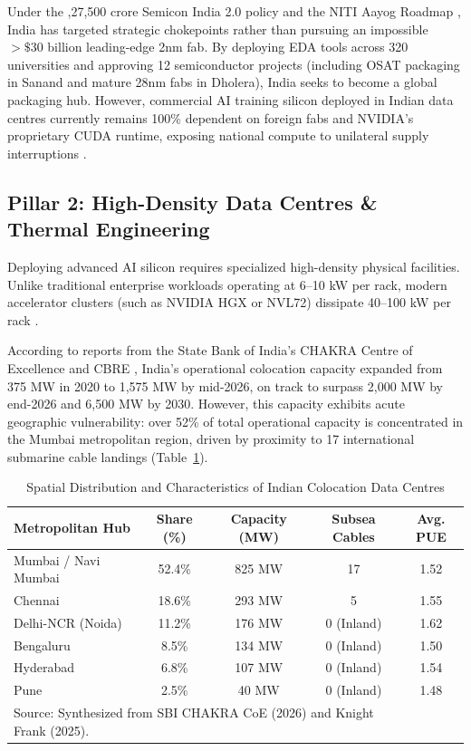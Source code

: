 \documentclass[conference,a4paper]{IEEEtran}
\begin{document}
Under the ,27,500 crore Semicon India 2.0 policy and the NITI Aayog Roadmap \cite{niti2026semicon}, India has targeted strategic chokepoints rather than pursuing an impossible $>\$30$ billion leading-edge 2nm fab. By deploying EDA tools across 320 universities and approving 12 semiconductor projects (including OSAT packaging in Sanand and mature 28nm fabs in Dholera), India seeks to become a global packaging hub. However, commercial AI training silicon deployed in Indian data centres currently remains 100\% dependent on foreign fabs and NVIDIA's proprietary CUDA runtime, exposing national compute to unilateral supply interruptions \cite{thakker2026sovereign}.

\subsection{Pillar 2: High-Density Data Centres \& Thermal Engineering}
Deploying advanced AI silicon requires specialized high-density physical facilities. Unlike traditional enterprise workloads operating at 6–10 kW per rack, modern accelerator clusters (such as NVIDIA HGX or NVL72) dissipate 40–100 kW per rack \cite{ieee_tcpmt2026cooling}. 

According to reports from the State Bank of India's CHAKRA Centre of Excellence \cite{sbichakra2026} and CBRE \cite{cbre2026dc}, India's operational colocation capacity expanded from 375 MW in 2020 to 1,575 MW by mid-2026, on track to surpass 2,000 MW by end-2026 and 6,500 MW by 2030. However, this capacity exhibits acute geographic vulnerability: over 52\% of total operational capacity is concentrated in the Mumbai metropolitan region, driven by proximity to 17 international submarine cable landings (Table~\ref{tab:dc_metros}).

\begin{table}[htbp]
\caption{Spatial Distribution and Characteristics of Indian Colocation Data Centres}
\begin{center}
\begin{tabularx}{\columnwidth}{lcccc}
\toprule
\textbf{Metropolitan Hub} & \textbf{Share (\%)} & \textbf{Capacity (MW)} & \textbf{Subsea Cables} & \textbf{Avg. PUE} \\
\midrule
Mumbai / Navi Mumbai & 52.4\% & 825 MW & 17 & 1.52 \\
Chennai & 18.6\% & 293 MW & 5 & 1.55 \\
Delhi-NCR (Noida) & 11.2\% & 176 MW & 0 (Inland) & 1.62 \\
Bengaluru & 8.5\% & 134 MW & 0 (Inland) & 1.50 \\
Hyderabad & 6.8\% & 107 MW & 0 (Inland) & 1.54 \\
Pune & 2.5\% & 40 MW & 0 (Inland) & 1.48 \\
\bottomrule
\multicolumn{4}{l}{\footnotesize Source: Synthesized from SBI CHAKRA CoE (2026) and Knight Frank (2025).}
\end{tabularx}
\label{tab:dc_metros}
\end{center}
\end{table}
\end{document}
